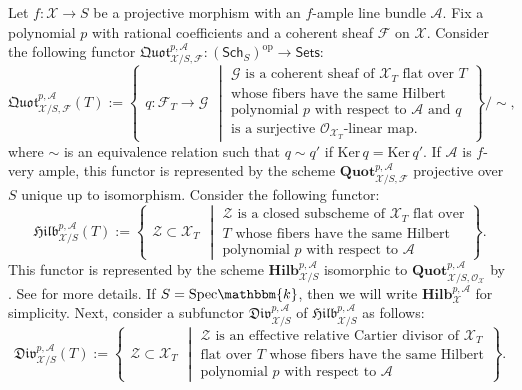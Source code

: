 \documentclass[12pt,twoside]{amsart}
\theoremstyle{definition}
\begin{document}
Let $f\colon \mathscr{X}\to S$ be a projective morphism with an $f$-ample line bundle $\mathscr{A}$.
Fix a polynomial $p$ with rational coefficients and a coherent sheaf $\mathscr{F}$ on $\mathscr{X}$.
Consider the following functor $\mathfrak{Quot}^{p,\mathscr{A}}_{\mathscr{X}/S,\mathscr{F}}\colon(\mathsf{Sch}_S)^{\mathrm{op}}\to \mathsf{Sets}$: \[
\mathfrak{Quot}^{p,\mathscr{A}}_{\mathscr{X}/S,\mathscr{F}}(T):=\left\{
\begin{array}{l}
q\colon \mathscr{F}_T\to\mathcal{G}
\end{array}
\middle|
\begin{array}{l}
\text{$\mathcal{G}$ is a coherent sheaf of $\mathscr{X}_T$ flat over $T$}\\
\text{whose fibers have the same Hilbert}\\
\text{polynomial $p$ with respect to $\mathscr{A}$ and $q$}\\
\text{is a surjective $\mathcal{O}_{\mathscr{X}_T}$-linear map.}
\end{array}\right\}/\sim,
\]
where $\sim$ is an equivalence relation such that $q\sim q'$ if $\mathrm{Ker}\,q=\mathrm{Ker}\,q'$.
If $\mathscr{A}$ is $f$-very ample, this functor is represented by the scheme $\mathbf{Quot}^{p,\mathscr{A}}_{\mathscr{X}/S,\mathscr{F}}$ projective over $S$ unique up to isomorphism. 
Consider the following functor:
\[
\mathfrak{Hilb}^{p,\mathscr{A}}_{\mathscr{X}/S}(T):=\left\{
\begin{array}{l}
\mathcal{Z}\subset \mathscr{X}_T
\end{array}
\middle|
\begin{array}{l}
\text{$\mathcal{Z}$ is a closed subscheme of $\mathscr{X}_T$ flat over}\\
\text{$T$ whose fibers have the same Hilbert}\\
\text{polynomial $p$ with respect to $\mathscr{A}$}
\end{array}\right\}.
\]
This functor is represented by the scheme $\mathbf{Hilb}^{p,\mathscr{A}}_{\mathscr{X}/S}$ isomorphic to $\mathbf{Quot}^{p,\mathscr{A}}_{\mathscr{X}/S,\mathcal{O}_{\mathscr{X}}}$ by \cite[Theorem 5.20]{FGA}. See \cite[\S5]{FGA} for more details.
If $S=\mathrm{Spec}\mathbbm{k}$, then we will write $\mathbf{Hilb}^{p,\mathscr{A}}_{\mathscr{X}}$ for simplicity.
Next, consider a subfunctor $\mathfrak{Div}^{p,\mathscr{A}}_{\mathscr{X}/S}$ of $\mathfrak{Hilb}^{p,\mathscr{A}}_{\mathscr{X}/S}$ as follows:
\[
\mathfrak{Div}^{p,\mathscr{A}}_{\mathscr{X}/S}(T):=\left\{
\begin{array}{l}
\mathcal{Z}\subset \mathscr{X}_T
\end{array}
\middle|
\begin{array}{l}
\text{$\mathcal{Z}$ is an effective relative Cartier divisor of $\mathscr{X}_T$}\\
\text{flat over $T$ whose fibers have the same Hilbert}\\
\text{polynomial $p$ with respect to $\mathscr{A}$}
\end{array}\right\}.
\]
\end{document}
